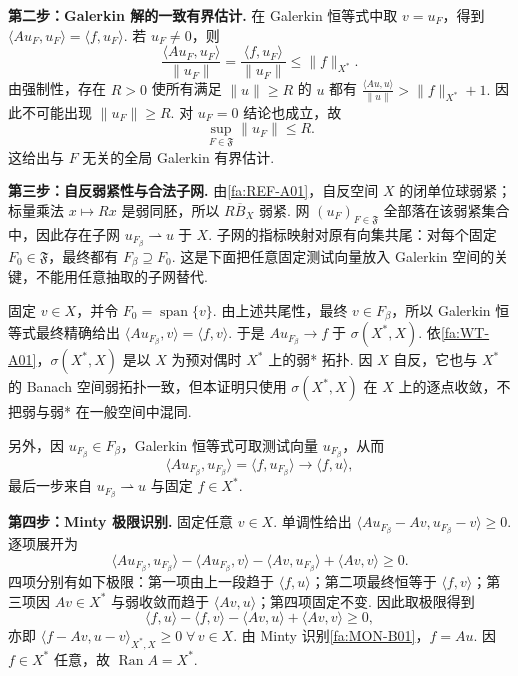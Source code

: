 \begin{FAProof}
\textbf{第二步：Galerkin 解的一致有界估计.} 在 Galerkin 恒等式中取 \(\displaystyle v=u_F\)，得到
\(\displaystyle \langle Au_F,u_F\rangle = \langle f,u_F\rangle.\)
若 \(\displaystyle u_F\neq0\)，则
\[
\frac{\langle Au_F,u_F\rangle}{\|u_F\|}
=
\frac{\langle f,u_F\rangle}{\|u_F\|}
\leqslant
\|f\|_{X^*}.
\]
由强制性，存在 \(\displaystyle R>0\) 使所有满足 \(\displaystyle\|u\|\geqslant R\) 的 \(\displaystyle u\) 都有
\(\displaystyle \frac{\langle Au,u\rangle}{\|u\|} > \|f\|_{X^*}+1.\)
因此不可能出现 \(\displaystyle\|u_F\|\geqslant R\). 对 \(\displaystyle u_F=0\) 结论也成立，故
\[
\sup_{F\in\mathfrak F}\|u_F\|
\leqslant
R.
\]
这给出与 \(\displaystyle F\) 无关的全局 Galerkin 有界估计.

\textbf{第三步：自反弱紧性与合法子网.} 由\autoref{fa:REF-A01}，自反空间 \(\displaystyle X\) 的闭单位球弱紧；标量乘法 \(\displaystyle x\mapsto Rx\) 是弱同胚，所以 \(\displaystyle R\overline B_X\) 弱紧. 网 \(\displaystyle(u_F)_{F\in\mathfrak F}\) 全部落在该弱紧集合中，因此存在子网
\(\displaystyle u_{F_\beta}\rightharpoonup u \;\text{于 }X.\)
子网的指标映射对原有向集共尾：对每个固定 \(\displaystyle F_0\in\mathfrak F\)，最终都有 \(\displaystyle F_\beta\supseteq F_0\). 这是下面把任意固定测试向量放入 Galerkin 空间的关键，不能用任意抽取的子网替代.

固定 \(\displaystyle v\in X\)，并令 \(\displaystyle F_0=\operatorname{span}\{v\}\). 由上述共尾性，最终 \(\displaystyle v\in F_\beta\)，所以 Galerkin 恒等式最终精确给出
\(\displaystyle \langle Au_{F_\beta},v\rangle = \langle f,v\rangle.\)
于是
\(\displaystyle Au_{F_\beta} \longrightarrow f \;\text{于 }\sigma(X^*,X).\)
依\autoref{fa:WT-A01}，\(\displaystyle\sigma(X^*,X)\) 是以 \(\displaystyle X\) 为预对偶时 \(\displaystyle X^*\) 上的弱* 拓扑. 因 \(\displaystyle X\) 自反，它也与 \(\displaystyle X^*\) 的 Banach 空间弱拓扑一致，但本证明只使用 \(\displaystyle\sigma(X^*,X)\) 在 \(\displaystyle X\) 上的逐点收敛，不把弱与弱* 在一般空间中混同.

另外，因 \(\displaystyle u_{F_\beta}\in F_\beta\)，Galerkin 恒等式可取测试向量 \(\displaystyle u_{F_\beta}\)，从而
\[
\langle Au_{F_\beta},u_{F_\beta}\rangle
=
\langle f,u_{F_\beta}\rangle
\longrightarrow
\langle f,u\rangle,
\]
最后一步来自 \(\displaystyle u_{F_\beta}\rightharpoonup u\) 与固定 \(\displaystyle f\in X^*\).

\textbf{第四步：Minty 极限识别.} 固定任意 \(\displaystyle v\in X\). 单调性给出
\(\displaystyle \langle Au_{F_\beta}-Av,u_{F_\beta}-v\rangle \geqslant0.\)
逐项展开为
\[
\langle Au_{F_\beta},u_{F_\beta}\rangle
-
\langle Au_{F_\beta},v\rangle
-
\langle Av,u_{F_\beta}\rangle
+
\langle Av,v\rangle
\geqslant0.
\]
四项分别有如下极限：第一项由上一段趋于 \(\displaystyle\langle f,u\rangle\)；第二项最终恒等于 \(\displaystyle\langle f,v\rangle\)；第三项因 \(\displaystyle Av\in X^*\) 与弱收敛而趋于 \(\displaystyle\langle Av,u\rangle\)；第四项固定不变. 因此取极限得到
\[
\langle f,u\rangle
-
\langle f,v\rangle
-
\langle Av,u\rangle
+
\langle Av,v\rangle
\geqslant0,
\]
亦即
\(\displaystyle \langle f-Av,u-v\rangle_{X^*,X} \geqslant0 \;\forall\,v\in X.\)
由 Minty 识别\autoref{fa:MON-B01}，\(\displaystyle f=Au\). 因 \(\displaystyle f\in X^*\) 任意，故 \(\displaystyle\operatorname{Ran}A=X^*\).


\end{FAProof}
